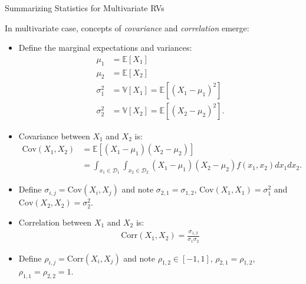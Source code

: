 \documentclass[9pt]{beamer}
\begin{document}
%
\begin{frame}{Summarizing Statistics for Multivariate RVs}

In multivariate case, concepts of {\em covariance} and {\em correlation} emerge:
\begin{itemize}
\item Define the marginal expectations and variances:
\begin{align*}
\mu_{1}&=\mathbb{E}[X_1]\\
\mu_{2}&=\mathbb{E}[X_2]\\
\sigma_1^2&=\mathbb{V}[X_1]=\mathbb{E}[(X_1-\mu_1)^2]\\
\sigma_2^2&=\mathbb{V}[X_2]=\mathbb{E}[(X_2-\mu_2)^2].
\end{align*}
\item Covariance between $X_1$ and $X_2$ is:
 \begin{align*}
\textrm{Cov}(X_1,X_2)&=\mathbb{E}[(X_1-\mu_1)(X_2-\mu_2)]\\
&=\int_{x_1\in \mathcal{D}_1}\int_{x_2\in\mathcal{D}_2}(X_1-\mu_1)(X_2-\mu_2)f(x_1,x_2)dx_1dx_2.
\end{align*}
\item Define $\sigma_{i,j}=\textrm{Cov}(X_i,X_j)$ and note $\sigma_{2,1}=\sigma_{1,2}$, $\textrm{Cov}(X_1,X_1)=\sigma_1^2$ and $\textrm{Cov}(X_2,X_2)=\sigma_2^2$. 
\item Correlation between $X_1$ and $X_2$ is:
 \begin{align*}
\textrm{Corr}(X_1,X_2)=\frac{\sigma_{1,2}}{\sigma_1\sigma_2}
\end{align*}
\item  Define $\rho_{i,j}=\textrm{Corr}(X_i,X_j)$ and note $\rho_{1,2}\in [-1,1]$, $\rho_{2,1}=\rho_{1,2}$, $\rho_{1,1}=\rho_{2,2}=1$. 
\end{itemize}

\end{frame}
\end{document}
